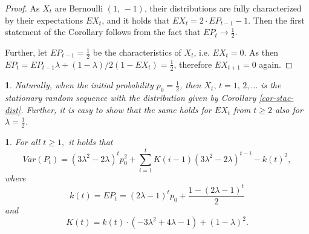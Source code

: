 \documentclass{amsart}
\theoremstyle{definition}
\theoremstyle{plain}
\newtheorem{prop}[thm]{\protect\propositionname}
\theoremstyle{plain}
\theoremstyle{plain}
\newtheorem{rem}[thm]{\protect\remarkname}
\numberwithin{equation}{section}
\providecommand{\propositionname}{Proposition}
\providecommand{\remarkname}{Remark}
\begin{document}
\begin{proof}
As $X_t$ are Bernoulli $(1,\,-1)$, their distributions are fully characterized by their expectations $EX_t$, and it holds that
$EX_t=2\cdot EP_{t-1}-1$. Then the first statement of the Corollary follows from the fact that $EP_t\to \frac{1}{2}.$

Further, let $EP_{t-1}=\frac{1}{2}$ be the characteristics of $X_t$, i.e.
$EX_t=0$. As then
$EP_t=EP_{t-1}\lambda+(1-\lambda)/2(1-EX_t)=\frac{1}{2}$, therefore $EX_{t+1}=0$ again.

\end{proof}

\begin{rem}
Naturally, when the initial probability
$p_0=\frac{1}{2}$, then $X_t,\,t=1,\,2,\dots$ is the stationary
random sequence with the distribution given by Corollary
\ref{cor-stac-dist}. Further, it is easy to show that the same holds for
$EX_t$ from $t\ge2$ also for $\lambda = \frac{1}{2}$.
\end{rem}

\begin{prop}
\label{PropVarP-succes}For all $t\geq1,$ it holds that
\begin{equation}
Var(P_{t})=(3\lambda^{2}-2\lambda)^{t}p_{0}^{2}+\sum_{i=1}^{t}K(i-1)(3\lambda^{2}-2\lambda)^{t-i}-k(t)^{2},\label{eq:VarP-proposition}
\end{equation}
 where
\[
k(t)=EP_{t}=(2\lambda-1)^{t}p_{0}+\frac{1-(2\lambda-1)^{t}}{2}
\]
 and
\[
K(t)=k(t)\cdot(-3\lambda^{2}+4\lambda-1)+(1-\lambda)^{2}.
\]
\end{prop}
\end{document}
